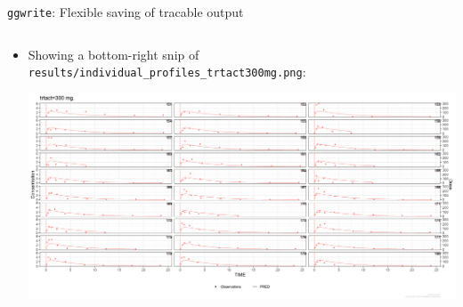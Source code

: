 \documentclass[
  8pt,
  ignorenonframetext,
  aspectratio=169]{beamer}
\providecommand{\tightlist}{%
  \setlength{\itemsep}{0pt}\setlength{\parskip}{0pt}}
\begin{document}
\begin{frame}[fragile]{\texttt{ggwrite}: Flexible saving of tracable
output}
\begin{columns}[T]
\begin{column}{0.48\textwidth}
\begin{itemize}
\tightlist
\item
  Showing a bottom-right snip of
  \texttt{results/individual\_profiles\_trtact300mg.png}:

  \begin{center}
  \includegraphics[trim={30cm 0 0 14cm},clip]{results/individual_profiles_trtact300mg.png}
  \end{center}
\end{itemize}
\end{column}
\end{columns}
\end{frame}
\end{document}
